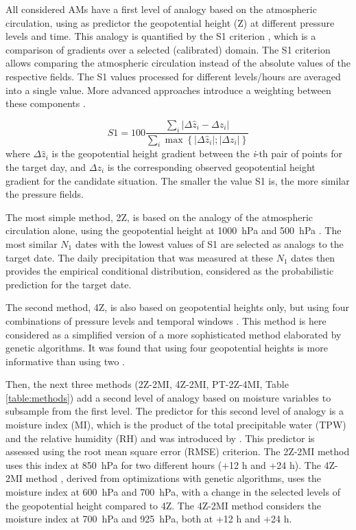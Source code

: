 \documentclass[alpha-refs]{wiley-article}
\begin{document}
All considered AMs have a first level of analogy based on the atmospheric circulation, using as predictor the geopotential height (Z) at different pressure levels and time. This analogy is quantified by the S1 criterion \citep[Eq.\ \ref{eq:S1}, ][]{Teweles1954, Brown2012}, which is a comparison of gradients over a selected (calibrated) domain. The S1 criterion allows comparing the atmospheric circulation instead of the absolute values of the respective fields. The S1 values processed for different levels/hours are averaged into a single value. More advanced approaches introduce a weighting between these components \citep{Horton2017a}.

\begin{equation}
	\label{eq:S1}
	S1=100 \frac{\sum_{i} \vert \Delta\hat{z}_{i} - \Delta z_{i} \vert}{\sum_{i} \max\left\lbrace \vert \Delta\hat{z}_{i} \vert; \vert \Delta z_{i} \vert \right\rbrace }
\end{equation}
where $\Delta \hat{z}_{i}$ is the geopotential height gradient between the \textit{i}-th pair of points for the target day, and $\Delta z_{i}$ is the corresponding observed geopotential height gradient for the candidate situation. The smaller the value S1 is, the more similar the pressure fields.

The most simple method, 2Z, is based on the analogy of the atmospheric circulation alone, using the geopotential height at 1000~hPa and 500~hPa \citep{Bontron2004}. The most similar $N_{1}$ dates with the lowest values of S1 are selected as analogs to the target date. The daily precipitation that was measured at these $N_{1}$ dates then provides the empirical conditional distribution, considered as the probabilistic prediction for the target date.

The second method, 4Z, is also based on geopotential heights only, but using four combinations of pressure levels and temporal windows \citep{Horton2018a}. This method is here considered as a simplified version of a more sophisticated method elaborated by genetic algorithms. It was found that using four geopotential heights is more informative than using two \citep{Horton2018a}.

Then, the next three methods (2Z-2MI, 4Z-2MI, PT-2Z-4MI, Table \ref{table:methods}) add a second level of analogy based on moisture variables to subsample from the first level. The predictor for this second level of analogy is a moisture index (MI), which is the product of the total precipitable water (TPW) and the relative humidity (RH) and was introduced by \citet{Bontron2004}. This predictor is assessed using the root mean square error (RMSE) criterion. The 2Z-2MI method \citep{Bontron2004} uses this index at 850~hPa for two different hours (+12 h and +24 h). The 4Z-2MI method \citep{Horton2018a}, derived from optimizations with genetic algorithms, uses the moisture index at 600~hPa and 700~hPa, with a change in the selected levels of the geopotential height compared to 4Z. The 4Z-2MI method \citep{BenDaoud2016} considers the moisture index at 700~hPa and 925~hPa, both at +12 h and +24 h.
\end{document}
